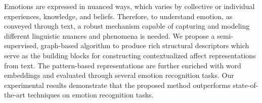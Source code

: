 Emotions are expressed in nuanced ways, which varies by collective or individual experiences, knowledge, and beliefs. Therefore, to understand emotion, as conveyed through text, a robust mechanism capable of capturing and modeling different linguistic nuances and phenomena is needed. We propose a semi-supervised, graph-based algorithm to produce rich structural descriptors which serve as the building blocks for constructing contextualized affect representations from text. The pattern-based representations are further enriched with word embeddings and evaluated through several emotion recognition tasks. Our experimental results demonstrate that the proposed method outperforms state-of-the-art techniques on emotion recognition tasks.
